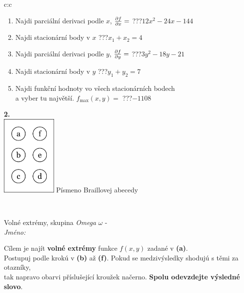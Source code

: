 \documentclass[10pt]{report}
\begin{document}
\begin{tabular}{c:c}
\begin{minipage}[c][104.5mm][t]{0.5\linewidth}
\begin{center}
\begin{minipage}{0.79\linewidth}
\begin{center}
\begin{varwidth}{\linewidth}
\begin{enumerate}
\item Najdi parciální derivaci podle $x$, $\pdv{f}{x}=$\quad \dotfill\; ???\;\dotfill \quad $12x^2-24x-144$
\item Najdi stacionární body v $x$\quad \dotfill\; ???\;\dotfill \quad $x_1+x_2=4$
\item Najdi parciální derivaci podle $y$, $\pdv{f}{y}=$\quad \dotfill\; ???\;\dotfill \quad $3y^2-18y-21$
\item Najdi stacionární body v $y$\quad \dotfill\; ???\;\dotfill \quad $y_1+y_2=7$
\item Najdi funkční hodnoty vo všech stacionárních bodech \\ \phantom{xxxxxx} a vyber tu najvětší. $f_{\text{max}}(x,y)=$\quad \dotfill\; ???\;\dotfill \quad $-1108$
\end{enumerate}
\end{varwidth}
\end{center}
\end{minipage}
\begin{minipage}{0.20\linewidth}
\begin{center}
{\Huge\bfseries 2.} \\[2mm]
\includegraphics[height=40mm]{../images/braille.png}
{\small Písmeno Braillovej abecedy}
\end{center}
\end{minipage}
\end{center}
\end{minipage}
\\ \hdashline
\begin{minipage}[c][104.5mm][t]{0.5\linewidth}
\begin{center}
\vspace{7mm}
{\huge Volné extrémy, skupina \textit{Omega $\omega$} -}\\[5mm]
\textit{Jméno:}\phantom{xxxxxxxxxxxxxxxxxxxxxxxxxxxxxxxxxxxxxxxxxxxxxxxxxxxxxxxxxxxxxxxxx}\\[5mm]
\begin{minipage}{0.95\linewidth}
\begin{center}
Cílem je najít \textbf{volné extrémy} funkce $f(x,y)$ zadané v \textbf{(a)}.\\Postupuj podle krokú v \textbf{(b)} až \textbf{(f)}. Pokud se medzivýsledky shodujú s těmi za otazníky,\\tak napravo obarvi příslušející kroužek načerno. \textbf{Spolu odevzdejte výsledné slovo}.

\end{center}
\end{minipage}
\end{center}
\end{minipage}
\end{tabular}
\end{document}
